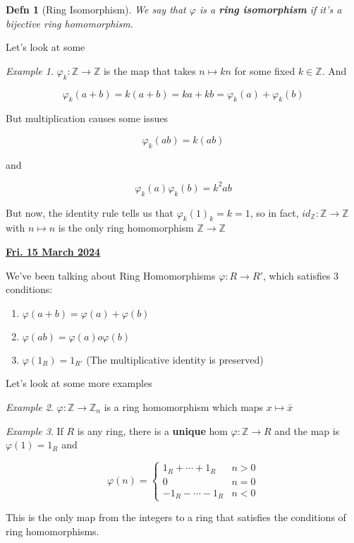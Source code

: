 \documentclass[12pt]{article}
\renewcommand{\date}[1]{\underline{\bf #1}}
\def\phi{\varphi}
\def\Z{{\mathbb Z}}
\newtheorem{definition}{Defn}
\theoremstyle{remark}
\theoremstyle{remark}
\theoremstyle{remark}
\newtheorem{example}{Example}
\theoremstyle{remark}
\theoremstyle{remark}
\begin{document}
\begin{definition}[Ring Isomorphism]
  We say that $\varphi$ is a {\bf ring isomorphism} if it's a bijective ring
  homomorphism.
\end{definition}

Let's look at some

\begin{example}
  $\varphi_k: \Z \to \Z$ is the map that takes $n \mapsto kn$ for some fixed $k
  \in \Z$. And

  \[
    \varphi_k(a + b) = k(a + b) = ka + kb = \varphi_k(a) + \varphi_k(b)
  \]

  But multiplication causes some issues

  \[
    \varphi_k(ab) = k(ab)
  \]

  and

  \[
    \varphi_k(a) \varphi_k(b) = k^2 ab
  \]

  But now, the identity rule tells us that $\varphi_k(1)_k = k = 1$, so in fact,
  $id_\Z : \Z \to \Z$ with $n \mapsto n$ is the only ring homomorphism $\Z \to \Z$
\end{example}

\date{Fri. 15 March 2024}

We've been talking about Ring Homomorphisms $\phi: R \to R'$, which satisfies 3
conditions:

\begin{enumerate}
  \item $\varphi(a + b) = \varphi(a) + \varphi(b)$
  \item $\varphi(ab) = \varphi(a)o\varphi(b)$
  \item $\varphi(1_R) = 1_{R'}$ (The multiplicative identity is preserved)
\end{enumerate}

Let's look at some more examples

\begin{example}
  $\varphi: \Z \to \Z_n$ is a ring homomorphism which maps $x \mapsto \bar x$
\end{example}

\begin{example}
  If $R$ is any ring, there is a {\bf unique} hom $\varphi: \Z \to R$ and the
  map is $\varphi(1) = 1_R$ and 

  \[
    \varphi(n) = \begin{cases}
      1_R + \cdots + 1_R & n > 0 \\
      0 & n = 0 \\
      -1_R - \cdots - 1_R & n < 0
    \end{cases}
  \]

  This is the only map from the integers to a ring that satisfies the conditions
  of ring homomorphisms.
\end{example}
\end{document}
